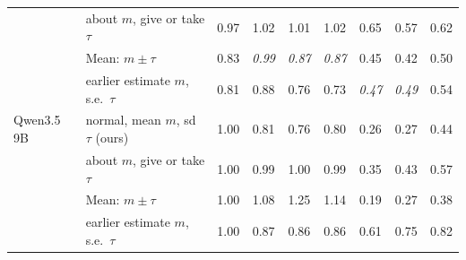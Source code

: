\begin{tabular}{llccccccc}
 & about $m$, give or take $\tau$ & 0.97 & 1.02 & 1.01 & 1.02 & 0.65 & 0.57 & 0.62 \\
 & Mean: $m \pm \tau$ & 0.83 & \textit{0.99} & \textit{0.87} & \textit{0.87} & 0.45 & 0.42 & 0.50 \\
 & earlier estimate $m$, s.e.\ $\tau$ & 0.81 & 0.88 & 0.76 & 0.73 & \textit{0.47} & \textit{0.49} & 0.54 \\
\midrule
Qwen3.5 9B & normal, mean $m$, sd $\tau$ (ours) & 1.00 & 0.81 & 0.76 & 0.80 & 0.26 & 0.27 & 0.44 \\
 & about $m$, give or take $\tau$ & 1.00 & 0.99 & 1.00 & 0.99 & 0.35 & 0.43 & 0.57 \\
 & Mean: $m \pm \tau$ & 1.00 & 1.08 & 1.25 & 1.14 & 0.19 & 0.27 & 0.38 \\
 & earlier estimate $m$, s.e.\ $\tau$ & 1.00 & 0.87 & 0.86 & 0.86 & 0.61 & 0.75 & 0.82 \\
\bottomrule
\end{tabular}

